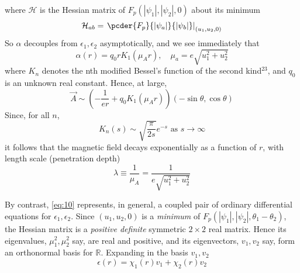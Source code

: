 where \( \mathcal{H} \) is the Hessian matrix of 
\( F_p(|\psi_1|, |\psi_2|, 0) \) about its minimum 
\begin{equation}
    \mathcal{H}_{ab} = \left. \pcder{F_p}{|\psi_a|}{|\psi_b|} 
        \right|_{(u_1, u_2, 0)}
    \label{eq:12}
\end{equation}
So \( \alpha \) decouples from \( \epsilon_1, \epsilon_2\) asymptotically, and 
we see immediately that
\begin{equation}
    \alpha(r) = q_0 r K_1(\mu_A r), \quad
    \mu_a = e\sqrt{u_1^2 + u_2^2}
    \label{eq:13}
\end{equation}
where \( K_n \) denotes the nth modified Bessel’s function of the second 
kind\( ^{23} \), and \( q_0 \) is an unknown real constant. Hence, at large,
\begin{equation}
    \vec{A} \sim \left( -\frac{1}{er} + q_0 K_1(\mu_A r) \right)
        (-\sin\theta, \cos\theta)
    \label{eq:14}
\end{equation}
Since, for all \( n \), 
\begin{equation}
    K_n(s) \sim \sqrt{\frac{\pi}{2s}}e^{-s} \text{ as } s \rightarrow \infty
    \label{eq:15}
\end{equation}
it follows that the magnetic field decays exponentially as a function of 
\( r \), with length scale (penetration depth)
\begin{equation}
    \lambda \equiv \frac{1}{\mu_A} = \frac{1}{e\sqrt{u_1^2 + u_2^2}}
    \label{eq:16}
\end{equation}

By contrast, \eqref{eq:10} represents, in general, a coupled pair of ordinary 
differential equations for \( \epsilon_1, \epsilon_2 \). Since 
\( (u_1, u_2, 0 ) \) is a \textit{minimum} of 
\( F_p(|\psi_1|, |\psi_2|, \theta_1 - \theta_2) \), the Hessian matrix is a 
\textit{positive definite} symmetric \( 2\times2 \) real matrix. Hence its 
eigenvalues, \( \mu_1^2, \mu_2^2\) say, are real and positive, and its 
eigenvectors, \( v_1, v_2 \) say, form an orthonormal basis for 
\( \mathbb{R} \). Expanding in the basis \( v_1, v_2 \)
\begin{equation}
    \epsilon(r) = \chi_1(r) v_1 + \chi_2(r) v_2
    \label{eq:17}
\end{equation}

